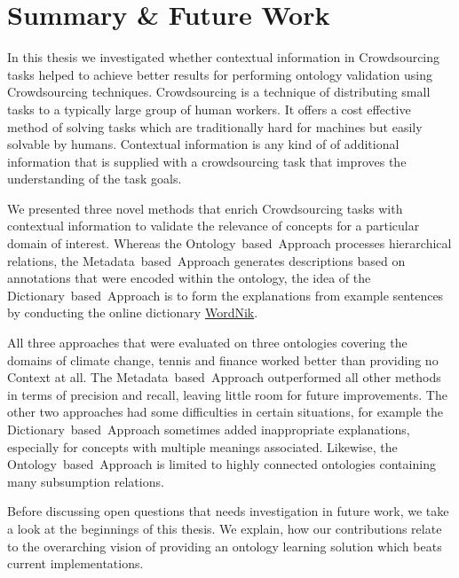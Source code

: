 \chapter{Summary \& Future Work}\label{chap:summary_and_future_work}





In this thesis we investigated whether contextual information in Crowdsourcing tasks helped to achieve better results for performing ontology validation using Crowdsourcing techniques. Crowdsourcing is a technique of distributing small tasks to a typically large group of human workers. It offers a cost effective method of solving tasks which are traditionally hard for machines but easily solvable by humans. Contextual information is any kind of of additional information that is supplied with a crowdsourcing task that improves the understanding of the task goals.

We presented three novel methods that enrich Crowdsourcing tasks with contextual information to validate the relevance of concepts for a particular domain of interest. Whereas the Ontology~based~Approach processes hierarchical relations, the Metadata~based~Approach generates descriptions based on annotations that were encoded within the ontology, the idea of the Dictionary~based~Approach is to form the explanations from example sentences by conducting the online dictionary \hyperref[sec:wordnik]{WordNik}.

All three approaches that were evaluated on three ontologies covering the domains of climate change, tennis and finance worked better than providing no Context at all. The Metadata~based~Approach outperformed all other methods in terms of precision and recall, leaving little room for future improvements. The other two approaches had some difficulties in certain situations, for example the Dictionary~based~Approach sometimes added inappropriate explanations, especially for concepts with multiple meanings associated. Likewise, the Ontology~based~Approach is limited to highly connected ontologies containing many subsumption relations. 

Before discussing open questions that needs investigation in future work, we take a look at the beginnings of this thesis. We explain, how our contributions relate to the overarching vision of providing an ontology learning solution which beats current implementations. 

